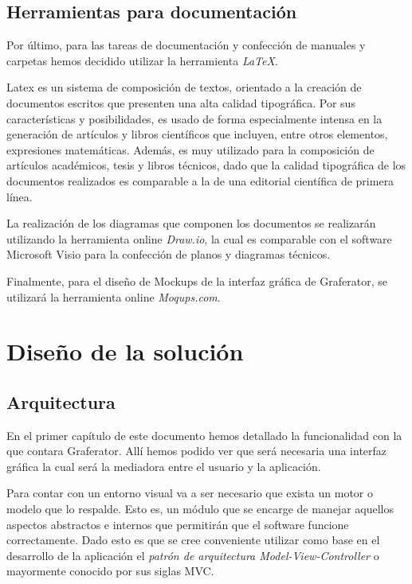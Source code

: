 \documentclass{book}
\begin{document}
\section{Herramientas para documentación}

Por último, para las tareas de documentación y confección de manuales y carpetas hemos decidido utilizar la herramienta \textit{LaTeX}. 
\par
Latex es un sistema de composición de textos, orientado a la creación de documentos escritos que presenten una alta calidad tipográfica. Por sus características y posibilidades, es usado de forma especialmente intensa en la generación de artículos y libros científicos que incluyen, entre otros elementos, expresiones matemáticas. Además, es muy utilizado para la composición de artículos académicos, tesis y libros técnicos, dado que la calidad tipográfica de los documentos realizados es comparable a la de una editorial científica de primera línea.
\par
La realización de los diagramas que componen los documentos se realizarán utilizando la herramienta online \textit{Draw.io}, la cual es comparable con el software Microsoft Visio para la confección de planos y diagramas técnicos.
\par
Finalmente, para el diseño de Mockups de la interfaz gráfica de Graferator, se utilizará la herramienta online \textit{Moqups.com}.





%
%
\chapter{Diseño de la solución}


\section{Arquitectura}

En el primer capítulo de este documento hemos detallado la funcionalidad con la que contara Graferator. Allí hemos podido ver que será necesaria una interfaz gráfica la cual será la mediadora entre el usuario y la aplicación. 
\par
Para contar con un entorno visual va a ser necesario que exista un motor o modelo que lo respalde. Esto es, un módulo que se encarge de manejar aquellos aspectos abstractos e internos que permitirán que el software funcione correctamente. Dado esto es que se cree conveniente utilizar como base en el desarrollo de la aplicación el \textit{patrón de arquitectura Model-View-Controller} o mayormente conocido por sus siglas MVC.
\bigskip
\end{document}
